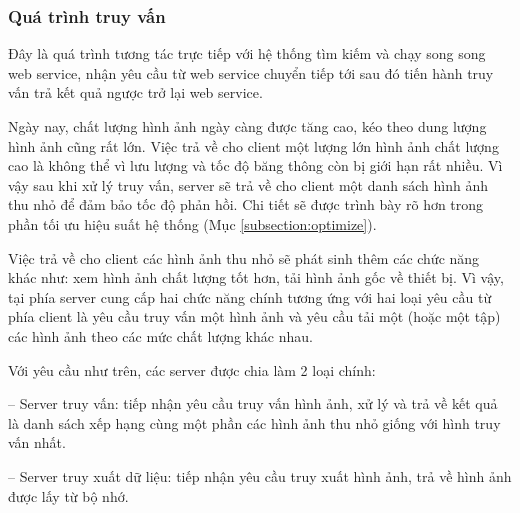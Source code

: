 \subsubsection{Quá trình truy vấn}
\label{subsubsection:truyvan_server}
Đây là quá trình tương tác trực tiếp với hệ thống tìm kiếm và chạy song song web service, nhận yêu cầu từ web service chuyển tiếp tới sau đó tiến hành truy vấn trả kết quả ngược trở lại web service.

Ngày nay, chất lượng hình ảnh ngày càng được tăng cao, kéo theo dung lượng hình ảnh cũng rất lớn. Việc trả về cho client một lượng lớn hình ảnh chất lượng cao là không thể vì lưu lượng và tốc độ băng thông còn bị giới hạn rất nhiều. Vì vậy sau khi xử lý truy vấn, server sẽ trả về cho client một danh sách hình ảnh thu nhỏ để đảm bảo tốc độ phản hồi. Chi tiết sẽ được trình bày rõ hơn trong phần tối ưu hiệu suất hệ thống (Mục \ref{subsection:optimize}).

Việc trả về cho client các hình ảnh thu nhỏ sẽ phát sinh thêm các chức năng khác như: xem hình ảnh chất lượng tốt hơn, tải hình ảnh gốc về thiết bị. Vì vậy, tại phía server cung cấp hai chức năng chính tương ứng với hai loại yêu cầu từ phía client là yêu cầu truy vấn một hình ảnh và yêu cầu tải một (hoặc một tập) các hình ảnh theo các mức chất lượng khác nhau.

Với yêu cầu như trên, các server được chia làm 2 loại chính:

-- Server truy vấn: tiếp nhận yêu cầu truy vấn hình ảnh, xử lý và trả về kết quả là danh sách xếp hạng cùng một phần các hình ảnh thu nhỏ giống với hình truy vấn nhất.

-- Server truy xuất dữ liệu: tiếp nhận yêu cầu truy xuất hình ảnh, trả về hình ảnh được lấy từ bộ nhớ.

